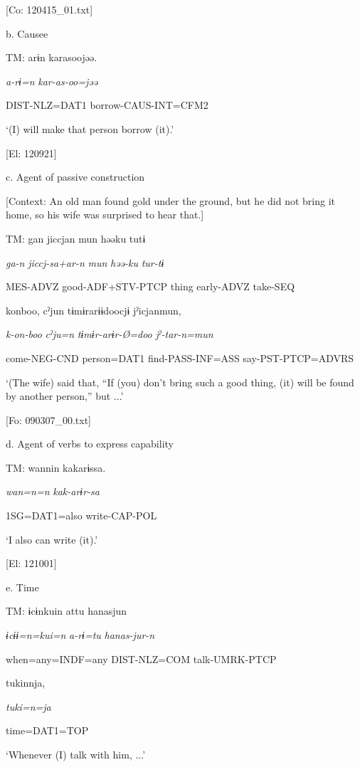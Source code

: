       [Co: 120415\_01.txt]

  b.  Causee

    TM:  arɨn  karasoojəə.

      \textit{a-rɨ=n}  \textit{kar-as-oo=jəə}

      DIST-NLZ=DAT1  borrow-CAUS-INT=CFM2

      ‘(I) will make that person borrow (it).’

      [El: 120921]

  c.  Agent of passive construction

    [Context: An old man found gold under the ground, but he did not bring it home, so his wife was surprised to hear that.]

    TM:  gan  jiccjan  mun  həəku  tutɨ

      \textit{ga-n}  \textit{jiccj-sa+ar-n}  \textit{mun}  \textit{həə-ku}  \textit{tur-tɨ}

      MES-ADVZ  good-ADF+STV-PTCP  thing  early-ADVZ  take-SEQ

      konboo,  cˀjun  tɨmɨrarɨɨdoocjɨ  jˀicjanmun,

      \textit{k-on-boo}  \textit{cˀju=n}  \textit{tɨmɨr-arɨr-Ø=doo}  \textit{jˀ-tar-n=mun}

      come-NEG-CND  person=DAT1  find{}-PASS-INF=ASS  say{}-PST-PTCP=ADVRS

      ‘(The wife) said that, “If (you) don’t bring such a good thing, (it) will be found by another person,” but ...’

      [Fo: 090307\_00.txt]

  d.  Agent of verbs to express capability

    TM:  wannin  kakarɨssa.

      \textit{wan=n=n}  \textit{kak-arɨr-sa}

      1SG=DAT1=also  write-CAP-POL

      ‘I also can write (it).’

      [El: 121001]

  e.  Time

    TM:  ɨcɨnkuin  attu  hanasjun

      \textit{ɨcɨɨ=n=kui=n}  \textit{a-rɨ=tu}  \textit{hanas-jur-n}

      when=any=INDF=any  DIST-NLZ=COM  talk-UMRK-PTCP

      tukinnja,

      \textit{tuki=n=ja}

      time=DAT1=TOP

      ‘Whenever (I) talk with him, ...’

